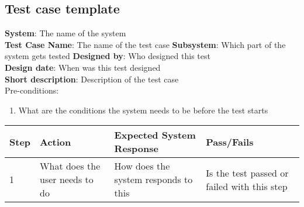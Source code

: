 \subsection{Test case template}

\textbf{System}:  The name of the system \\
\textbf{Test Case Name}:  The name of the test case
\textbf{Subsystem}:  Which part of the system gets tested
\textbf{Designed by}:  Who designed this test\\
\textbf{Design date}: When was this test designed \\
\textbf{Short description}: Description of the test case \\

Pre-conditions: \\
\begin{enumerate}
\item What are the conditions the system needs to be before the test starts
\end{enumerate}

\begin{longtable}{ | p{0.8cm} | p{4.5cm} | p{6cm} | p{1.5cm} |}
\hline
Step & Action & Expected System Response & Pass/Fails  \\ \hline
1 & What does the user needs to do & How does the system responds to this & Is the test passed or failed with this step  \\ \hline

\end{longtable}